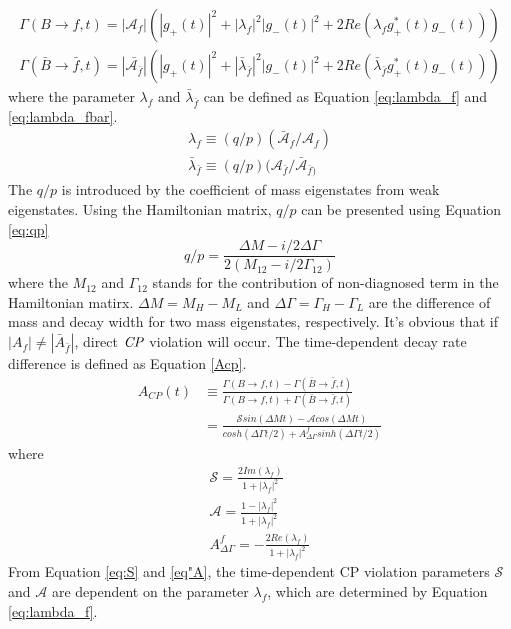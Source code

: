 \begin{eqnarray}
\Gamma(B\to f,t)=|\mathcal{A}_f|(|g_+(t)|^2+|\lambda_f|^2|g_-(t)|^2+2Re(\lambda_f g^*_+(t)g_-(t))) \label{eq:gamma_B}\\
\Gamma(\bar{B}\to \bar{f},t)=|\bar{\mathcal{A}_{\bar{f}}}|(|g_+(t)|^2+|\bar{\lambda}_{\bar{f}}|^2|g_-(t)|^2+2Re(\bar{\lambda}_{\bar{f}} g^*_+(t)g_-(t)))\label{eq:gamma_Bbar}
\end{eqnarray} where the parameter $\lambda_f$ and $\bar{\lambda}_{\bar{f}}$ can be defined as Equation \ref{eq:lambda_f} and \ref{eq:lambda_fbar}.
\begin{eqnarray}
\lambda_f \equiv (q/p) (\bar{\mathcal{A}}_f / \mathcal{A}_f) \label{eq:lambda_f}\\
\bar{\lambda}_{\bar{f}} \equiv (q/p) ( \mathcal{A}_{\bar{f}}/\bar{\mathcal{A}}_{\bar{f})} \label{eq:lambda_fbar}
\end{eqnarray} 
The $q/p$ is introduced by the coefficient of mass eigenstates from weak eigenstates. Using the Hamiltonian matrix, $q/p$ can be presented using Equation \ref{eq:qp}
\begin{equation}\label{eq:qp}
	q/p = \frac{\Delta M - i/2 \Delta \Gamma}{2(M_{12}- i/2 \Gamma_{12})}
\end{equation}
where the $M_{12}$ and $\Gamma_{12}$ stands for the contribution of non-diagnosed term in the Hamiltonian matirx. $\Delta{M}=M_H-M_L$ and $\Delta{\Gamma}=\Gamma_H-\Gamma_L$ are the difference of mass and decay width for two mass eigenstates, respectively.
It's obvious that if $|A_f| \neq |\bar{A}_{\bar{f}}|$, direct $\it{CP}$ violation will occur.  
The time-dependent decay rate difference is defined as Equation \ref{Acp}.
\begin{equation}\label{Acp}
\begin{split}
A_{CP}(t)&\equiv \frac{\Gamma(B\to f,t)-\Gamma(\bar{B}\to \bar{f},t)}{\Gamma(B\to f,t)+\Gamma(\bar{B}\to \bar{f},t)}\\
&=\frac{\mathcal{S} sin(\Delta{M}t)-\mathcal{A}cos(\Delta{M}t)}
{cosh(\Delta \Gamma t/2)+A^f_{\Delta \Gamma}sinh(\Delta \Gamma t/2)}
\end{split}
\end{equation}
where
\begin{eqnarray}\label{cp-parameters}
\mathcal{S}=\frac{2Im(\lambda_f)}{1+|\lambda_f|^2} \label{eq:S}\\
\mathcal{A}=\frac{1-|\lambda_f|^2}{1+|\lambda_f|^2}\label{eq:A}\\
A^f_{\Delta \Gamma}=-\frac{2Re(\lambda_f)}{1+|\lambda_f|^2}
\end{eqnarray}
From Equation \ref{eq:S} and \ref{eq"A}, the time-dependent CP violation parameters $\mathcal{S}$ and $\mathcal{A}$ are dependent on the parameter $\lambda_f$, which are determined by Equation \ref{eq:lambda_f}. 

